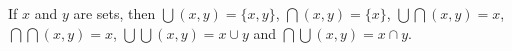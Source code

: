 If $x$ and $y$ are sets, then $\bigcup (x,y) = \{x, y\}$, $\bigcap (x,y) = \{x\}$, $\bigcup \bigcap (x,y) = x$, $\bigcap \bigcap (x,y) = x$, $\bigcup \bigcup (x,y) = x \cup y$ and $\bigcap \bigcup (x,y) = x \cap y$.
